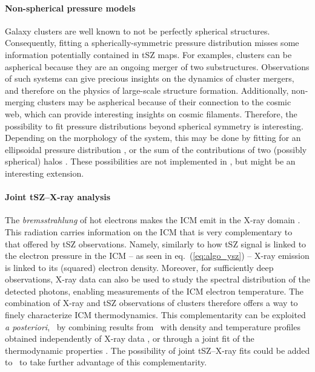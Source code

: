 \paragraph{Non-spherical pressure models} %
Galaxy clusters are well known to not be perfectly spherical structures.
Consequently, fitting a spherically-symmetric pressure distribution misses some information potentially contained in tSZ maps.
For examples, clusters can be aspherical because they are an ongoing merger of two substructures.
Observations of such systems can give precious insights on the dynamics of cluster mergers, and therefore on the physics of large-scale structure formation.
Additionally, non-merging clusters may be aspherical because of their connection to the cosmic web, which can provide interesting insights on cosmic filaments.
Therefore, the possibility to fit pressure distributions beyond spherical symmetry is interesting.
Depending on the morphology of the system, this may be done by fitting for an ellipsoidal pressure distribution \citep[\eg][]{sarazin_deep_2016}, or the sum of the contributions of two (possibly spherical) halos \citep[\eg][]{artis_psz2_2022}.
These possibilities are not implemented in \panco, but might be an interesting extension.

\paragraph{Joint tSZ--X-ray analysis} %
The \textit{bremsstrahlung} of hot electrons makes the ICM emit in the X-ray domain \citep[see \eg][for reviews]{bohringer_x-ray_2010, bohringer_x-ray_2013}.
This radiation carries information on the ICM that is very complementary to that offered by tSZ observations.
Namely, similarly to how tSZ signal is linked to the electron pressure in the ICM -- as seen in eq.~(\ref{eq:algo_ysz}) -- X-ray emission is linked to its (squared) electron density.
Moreover, for sufficiently deep observations, X-ray data can also be used to study the spectral distribution of the detected photons, enabling measurements of the ICM electron temperature.
The combination of X-ray and tSZ observations of clusters therefore offers a way to finely characterize ICM thermodynamics.
This complementarity can be exploited \textit{a posteriori}, \eg\ by combining results from \panco\ with density and temperature profiles obtained independently of X-ray data \citep[\eg][]{keruzore_exploiting_2020}, or through a joint fit of the thermodynamic properties \citep[\eg][]{castagna_joxsz_2020-1}.
The possibility of joint tSZ--X-ray fits could be added to \panco\ to take further advantage of this complementarity.

